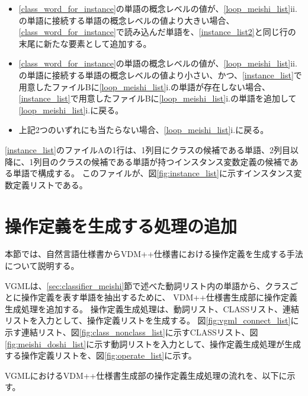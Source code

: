 \begin{enumerate}
\begin{enumerate}
\begin{enumerate}
                        \begin{itemize}
                            \item \ref{class_word_for_instance}の単語の概念レベルの値が、\ref{loop_meishi_list}ii.の単語に接続する単語の概念レベルの値より大きい場合、\ref{class_word_for_instance}で読み込んだ単語を、\ref{instance_list2}と同じ行の末尾に新たな要素として追加する。
                            \item \ref{class_word_for_instance}の単語の概念レベルの値が、\ref{loop_meishi_list}ii.の単語に接続する単語の概念レベルの値より小さい、かつ、\ref{instance_list}で用意したファイルBに\ref{loop_meishi_list}i.の単語が存在しない場合、\ref{instance_list}で用意したファイルBに\ref{loop_meishi_list}i.の単語を追加して\ref{loop_meishi_list}i.に戻る。
                            \item 上記2つのいずれにも当たらない場合、\ref{loop_meishi_list}i.に戻る。
                        \end{itemize}
                \end{enumerate}
        \end{enumerate}
\end{enumerate}

\ref{instance_list}のファイルAの1行は、1列目にクラスの候補である単語、2列目以降に、1列目のクラスの候補である単語が持つインスタンス変数定義の候補である単語で構成する。
このファイルが、図\ref{fig:instance_list}に示すインスタンス変数定義リストである。

\section{操作定義を生成する処理の追加}
\label{sec:operate_generate}
本節では、自然言語仕様書からVDM++仕様書における操作定義を生成する手法について説明する。

VGMLは、\ref{sec:classifier_meishi}節で述べた動詞リスト内の単語から、クラスごとに操作定義を表す単語を抽出するために、
VDM++仕様書生成部に操作定義生成処理を追加する。
操作定義生成処理は、動詞リスト、CLASSリスト、連結リストを入力として、操作定義リストを生成する。
図\ref{fig:vgml_connect_list}に示す連結リスト、図\ref{fig:class_nonclass_list}に示すCLASSリスト、図\ref{fig:meishi_doshi_list}に示す動詞リストを入力として、操作定義生成処理が生成する操作定義リストを、図\ref{fig:operate_list}に示す。

VGMLにおけるVDM++仕様書生成部の操作定義生成処理の流れを、以下に示す。

